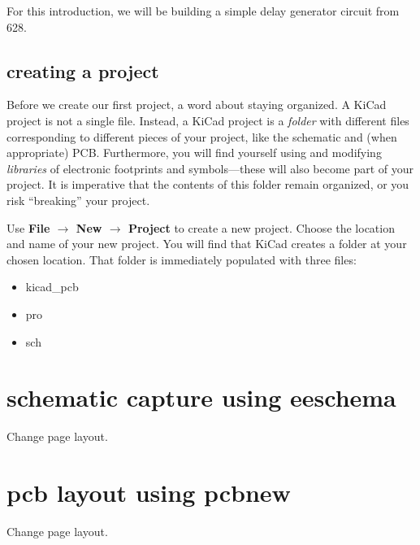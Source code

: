 \documentclass[12pt]{article}
\newenvironment{ditemize}
  {
  \begin{itemize}
  \renewcommand{\labelitemi}{$\rightarrow$}
  }
  {
  \end{itemize}
  }
\newcommand{\ra}{$\rightarrow$}
\begin{document}
For this introduction, we will be building a simple delay generator circuit from 628.

\subsection{creating a project}

Before we create our first project, a word about staying organized.
A KiCad project is not a single file.
Instead, a KiCad project is a \emph{folder} with different files corresponding to different pieces of your project, like the schematic and (when appropriate) PCB.
Furthermore, you will find yourself using and modifying \emph{libraries} of electronic footprints and symbols---these will also become part of your project.
It is imperative that the contents of this folder remain organized, or you risk ``breaking'' your project.

Use \textbf{File \ra{} New \ra{} Project} to create a new project.
Choose the location and name of your new project.
You will find that KiCad creates a folder at your chosen location.
That folder is immediately populated with three files:
\begin{ditemize}
  \item kicad\_pcb
  \item pro
  \item sch
\end{ditemize}


\clearpage
\section{schematic capture using eeschema}


Change page layout.

\clearpage
\section{pcb layout using pcbnew}

Change page layout.
\end{document}
